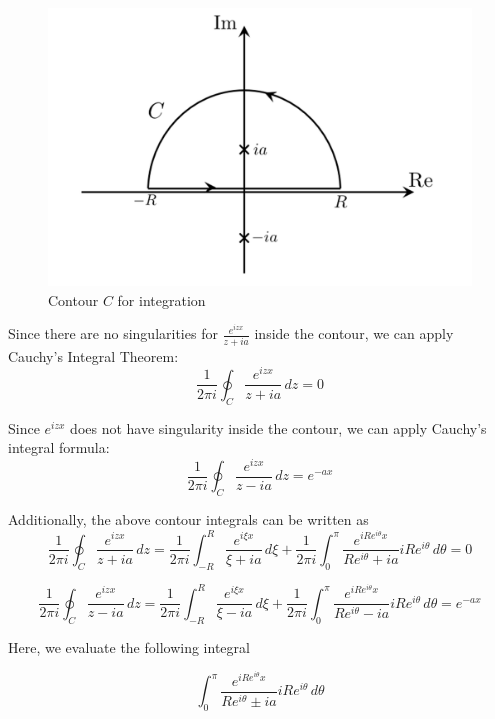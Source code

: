 \documentclass[letterpaper, 12pt]{article}
\theoremstyle{custom}
\begin{document}
\begin{figure}[htbp]
  \centering
  \includegraphics[width=.7\columnwidth]{Contour1.png}
  \caption{Contour $C$ for integration}
  \label{fig1}
\end{figure}

Since there are no singularities for $\displaystyle \frac{e^{izx}}{z+ia}$ inside the contour, we can apply Cauchy's Integral Theorem:
\begin{equation*}
  \frac{1}{2 \pi i} \oint_C \frac{e^{i z x}}{z+ia} \, dz = 0
\end{equation*}

Since $e^{izx}$ does not have singularity inside the contour, we can apply Cauchy's integral formula:
\begin{equation*}
  \frac{1}{2 \pi i} \oint_C \frac{e^{i z x}}{z-ia} \, dz = e^{-a x}
\end{equation*}

Additionally, the above contour integrals can be written as
\begin{equation*}
  \frac{1}{2 \pi i} \oint_C \frac{e^{i z x}}{z+ia} \, dz 
  = \frac{1}{2 \pi i} \int_{-R}^{R} \frac{e^{i\xi x}}{\xi+ia} \, d\xi  + \frac{1}{2 \pi i} \int_{0}^{\pi} \frac{e^{i Re^{i \theta} x}}{Re^{i \theta}+ia} iRe^{i \theta} \, d \theta
  =0
\end{equation*}

\begin{equation*}
  \frac{1}{2 \pi i} \oint_C \frac{e^{i z x}}{z-ia} \, dz 
  = \frac{1}{2 \pi i} \int_{-R}^{R} \frac{e^{i\xi x}}{\xi-ia} \, d\xi  + \frac{1}{2 \pi i} \int_{0}^{\pi} \frac{e^{i Re^{i \theta} x}}{Re^{i \theta}-ia} iRe^{i \theta} \, d \theta
  = e^{-a x}
\end{equation*}

Here, we evaluate the following integral

\begin{equation*}
  \int_{0}^{\pi} \frac{e^{i Re^{i \theta} x}}{Re^{i \theta} \pm ia} iRe^{i \theta} \, d \theta
\end{equation*}
\end{document}
